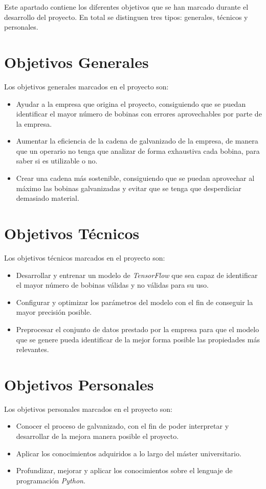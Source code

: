 
Este apartado contiene los diferentes objetivos que se han marcado durante el desarrollo del proyecto. En total se distinguen tres tipos: generales, técnicos y personales. 

\section{Objetivos Generales}
Los objetivos generales marcados en el proyecto son:
\begin{itemize}
    \item Ayudar a la empresa que origina el proyecto, consiguiendo que se puedan identificar el mayor número de bobinas con errores aprovechables por parte de la empresa.
    \item Aumentar la eficiencia de la cadena de galvanizado de la empresa, de manera que un operario no tenga que analizar de forma exhaustiva cada bobina, para saber si es utilizable o no.
    \item Crear una cadena más sostenible, consiguiendo que se puedan aprovechar al máximo las bobinas galvanizadas y evitar que se tenga que desperdiciar demasiado material.    
\end{itemize}

\section{Objetivos Técnicos}
Los objetivos técnicos marcados en el proyecto son:
\begin{itemize}
    \item Desarrollar y entrenar un modelo de \emph{TensorFlow} que sea capaz de identificar el mayor número de bobinas válidas y no válidas para su uso.
    \item Configurar y optimizar los parámetros del modelo con el fin de conseguir la mayor precisión posible.
    \item Preprocesar el conjunto de datos prestado por la empresa para que el modelo que se genere pueda identificar de la mejor forma posible las propiedades más relevantes.
\end{itemize}

\section{Objetivos Personales}
Los objetivos personales marcados en el proyecto son:
\begin{itemize}
    \item Conocer el proceso de galvanizado, con el fin de poder interpretar y desarrollar de la mejora manera posible el proyecto.
    \item Aplicar los conocimientos adquiridos a lo largo del máster universitario.
    \item Profundizar, mejorar y aplicar los conocimientos sobre el lenguaje de programación \emph{Python}.
\end{itemize}